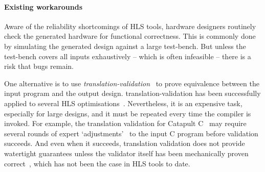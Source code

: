\paragraph{Existing workarounds}

Aware of the reliability shortcomings of \gls{HLS} tools, hardware designers
routinely check the generated hardware for functional correctness.  This is
commonly done by simulating the generated design against a large test-bench.
But unless the test-bench covers all inputs exhaustively -- which is often
infeasible -- there is a risk that bugs remain.

One alternative is to use
\emph{\gls{translation-validation}}~\cite{pnueli98_trans} to prove equivalence
between the input program and the output design. \Gls{translation-validation}
has been successfully applied to several \gls{HLS}
optimisations~\cite{kim04_autom_fsmd,
  karfa06_formal_verif_method_sched_high_synth,
  chouksey20_verif_sched_condit_behav_high_level_synth,
  banerjee14_verif_code_motion_techn_using_value_propag,
  chouksey19_trans_valid_code_motion_trans_invol_loops}.  Nevertheless, it is an
expensive task, especially for large designs, and it must be repeated every time
the compiler is invoked.  For example, the translation validation for Catapult
C~\cite{mentor20_catap_high_level_synth} may require several rounds of expert
`adjustments'~\cite[p.~3]{slec_whitepaper} to the input C program before
validation succeeds. And even when it succeeds, translation validation does not
provide watertight guarantees unless the validator itself has been mechanically
proven correct~\cite[e.g.][]{tristan08_formal_verif_trans_valid}, which has not
been the case in \gls{HLS} tools to date.


